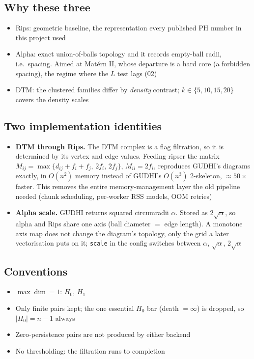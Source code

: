 \documentclass[11pt]{article}
\begin{document}
\subsection*{Why these three}
\begin{itemize}
  \item Rips: geometric baseline, the representation every published PH number in this project used
  \item Alpha: exact union-of-balls topology and it records empty-ball radii, i.e.\ spacing. Aimed at Mat\'ern II, whose departure is a hard core (a forbidden spacing), the regime where the $L$ test lags (02)
  \item DTM: the clustered families differ by \emph{density} contrast; $k\in\{5,10,15,20\}$ covers the density scales
\end{itemize}

\subsection*{Two implementation identities}
\begin{itemize}
  \item \textbf{DTM through Rips.} The DTM complex is a flag filtration, so it is determined by its vertex and edge values. Feeding ripser the matrix $M_{ij}=\max\{d_{ij}+f_i+f_j,\,2f_i,\,2f_j\}$, $M_{ii}=2f_i$, reproduces GUDHI's diagrams exactly, in $O(n^2)$ memory instead of GUDHI's $O(n^3)$ 2-skeleton, $\approx50\times$ faster. This removes the entire memory-management layer the old pipeline needed (chunk scheduling, per-worker RSS models, OOM retries)
  \item \textbf{Alpha scale.} GUDHI returns squared circumradii $\alpha$. Stored as $2\sqrt\alpha$, so alpha and Rips share one axis (ball diameter $=$ edge length). A monotone axis map does not change the diagram's topology, only the grid a later vectorisation puts on it; \texttt{scale} in the config switches between $\alpha$, $\sqrt\alpha$, $2\sqrt\alpha$
\end{itemize}

\subsection*{Conventions}
\begin{itemize}
  \item $\max\dim=1$: $H_0$, $H_1$
  \item Only finite pairs kept; the one essential $H_0$ bar (death $=\infty$) is dropped, so $|H_0| = n-1$ always
  \item Zero-persistence pairs are not produced by either backend
  \item No thresholding: the filtration runs to completion
\end{itemize}
\end{document}
